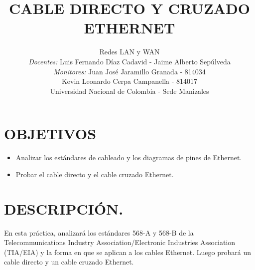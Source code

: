 \documentclass[journal]{IEEEtran}
\title{\textbf{CABLE DIRECTO Y CRUZADO \\ ETHERNET}}
\author{Redes LAN y WAN \\
	\textit{Docentes:} Luis Fernando Díaz Cadavid -  Jaime Alberto Sepúlveda\\ 
	\textit{Monitores:} Juan José Jaramillo Granada - 814034 \\
	Kevin Leonardo Cerpa Campanella - 814017 \\
	Universidad Nacional de Colombia - Sede Manizales}
\date{}
\begin{document}
\maketitle

\section{OBJETIVOS}

\begin{itemize}
	\item Analizar los estándares de cableado y los diagramas de pines de Ethernet.
	\item Probar el cable directo y el cable cruzado Ethernet.
\end{itemize}

\section{DESCRIPCIÓN.}
En esta práctica, analizará los estándares 568-A y 568-B de la Telecommunications Industry Association/Electronic Industries Association (TIA/EIA) y la forma en que se aplican a los cables Ethernet. Luego probará un cable directo y un cable cruzado Ethernet.
\end{document}
